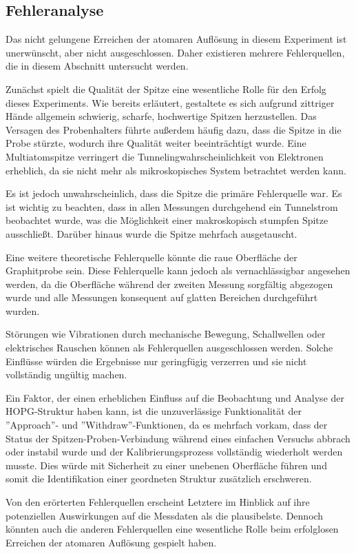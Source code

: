\subsection*{Fehleranalyse}
Das nicht gelungene Erreichen der atomaren Auflösung in diesem Experiment ist unerwünscht, aber nicht ausgeschlossen. Daher existieren mehrere Fehlerquellen, die in diesem Abschnitt untersucht werden.


Zunächst spielt die Qualität der Spitze eine wesentliche Rolle für den Erfolg dieses Experiments. Wie bereits erläutert, gestaltete es sich aufgrund zittriger Hände allgemein schwierig, scharfe, hochwertige Spitzen herzustellen.
Das Versagen des Probenhalters führte außerdem häufig dazu, dass die Spitze in die Probe stürzte, wodurch ihre Qualität weiter beeinträchtigt wurde. Eine Multiatomspitze verringert die Tunnelingwahrscheinlichkeit von Elektronen erheblich, da sie nicht mehr als mikroskopisches System betrachtet werden kann.


Es ist jedoch unwahrscheinlich, dass die Spitze die primäre Fehlerquelle war. Es ist wichtig zu beachten, dass in allen Messungen durchgehend ein Tunnelstrom beobachtet wurde, was die Möglichkeit einer makroskopisch stumpfen Spitze ausschließt. Darüber hinaus wurde die Spitze mehrfach ausgetauscht.


Eine weitere theoretische Fehlerquelle könnte die raue Oberfläche der Graphitprobe sein. Diese Fehlerquelle kann jedoch als vernachlässigbar angesehen werden, da die Oberfläche während der zweiten Messung sorgfältig abgezogen wurde und alle Messungen konsequent auf glatten Bereichen durchgeführt wurden.


Störungen wie Vibrationen durch mechanische Bewegung, Schallwellen oder elektrisches Rauschen können als Fehlerquellen ausgeschlossen werden. Solche Einflüsse würden die Ergebnisse nur geringfügig verzerren und sie nicht vollständig ungültig machen.

Ein Faktor, der einen erheblichen Einfluss auf die Beobachtung und Analyse der HOPG-Struktur haben kann, ist die unzuverlässige Funktionalität der ''Approach''- und ''Withdraw''-Funktionen, da es mehrfach vorkam, dass der Status der Spitzen-Proben-Verbindung während eines einfachen Versuchs abbrach oder instabil wurde und der Kalibrierungsprozess vollständig wiederholt werden musste. Dies würde mit Sicherheit zu einer unebenen Oberfläche führen und somit die Identifikation einer geordneten Struktur zusätzlich erschweren.


Von den erörterten Fehlerquellen erscheint Letztere im Hinblick auf ihre potenziellen Auswirkungen auf die Messdaten als die plausibelste. Dennoch könnten auch die anderen Fehlerquellen eine wesentliche Rolle beim erfolglosen Erreichen der atomaren Auflösung gespielt haben.


